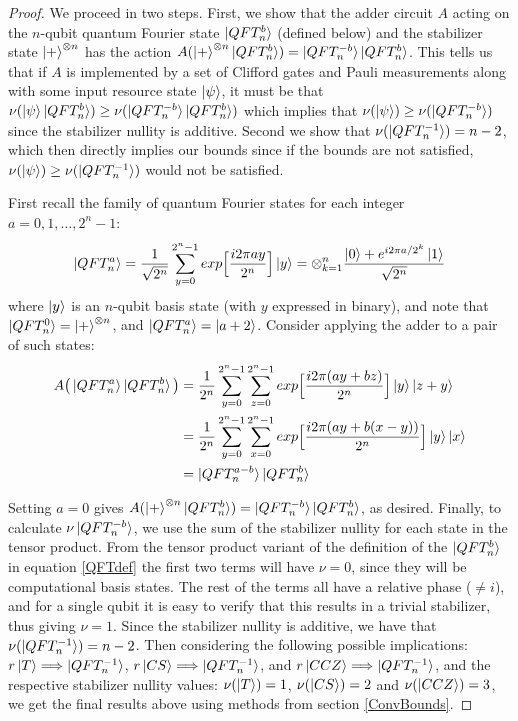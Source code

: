 \documentclass[12pt]{dalthesis}
\begin{document}
\begin{proof}
We proceed in two steps. First, we show that the adder circuit $A$ acting on the $n$-qubit quantum Fourier state $\ket{QFT_n^b}$ (defined below) and the stabilizer state $\ket{+}^{\otimes n}$ has the action $A(\ket{+}^{\otimes n} \ket{QFT_n^b}) = \ket{QFT_n^{-b}}\ket{QFT_n^b}$. This tells us that if $A$ is implemented by a set of Clifford gates and Pauli measurements along with some input resource state $\ket{\psi}$, it must be that $\nu (\ket{\psi} \ket{QFT_n^b}) \geq \nu(\ket{QFT_n^{-b}} \ket{QFT_n^b})$ which implies that $\nu (\ket{\psi}) \geq \nu(\ket{QFT_n^{-b}})$ since the stabilizer nullity is additive. Second we show that $\nu(\ket{QFT_n^{-1}}) = n-2$, which then directly implies our bounds since if the bounds are not satisfied, $\nu(\ket{\psi}) \geq \nu(\ket{QFT_n^{-1}})$ would not be satisfied.

First recall the family of quantum Fourier states for each integer $a = 0, 1, \dots, 2^n - 1$:
\begin{equation}
\label{QFTdef}
\ket{QFT_n^a} = \frac{1}{\sqrt{2^n}} \sum\limits_{y=0}^{2^n-1} exp \Big[ \frac{i2 \pi a y}{2^n} \Big] \ket{y} = \otimes_{k=1}^n \frac{\ket{0} + e^{i2\pi a/2^k} \ket{1}}{\sqrt{2^n}}
\end{equation}
where $\ket{y}$ is an $n$-qubit basis state (with $y$ expressed in binary), and note that $\ket{QFT_n^0} = \ket{+}^{\otimes n}$, and $\ket{QFT_n^a} = \ket{a + 2}$. Consider applying the adder to a pair of such states:
\begin{equation}
\begin{split}
A \big(\ket{QFT_n^a} \ket{QFT_n^b} \big) & = \frac{1}{2^n} \sum\limits_{y=0}^{2^n-1} \sum\limits_{z=0}^{2^n-1} exp \Big[ \frac{i2 \pi (ay + bz)}{2^n} \Big] \ket{y}\ket{z+y} \\
& = \frac{1}{2^n} \sum\limits_{y=0}^{2^n-1} \sum\limits_{x=0}^{2^n-1} exp \Big[ \frac{i2 \pi (ay + b(x-y))}{2^n} \Big] \ket{y}\ket{x} \\
& = \ket{QFT_n^{a-b}}\ket{QFT_n^b}
\end{split}
\end{equation}

Setting $a=0$ gives $A(\ket{+}^{\otimes n} \ket{QFT_n^b}) = \ket{QFT_n^{-b}}\ket{QFT_n^b}$, as desired. Finally, to calculate $\nu \ket{QFT_n^{-b}}$, we use the sum of the stabilizer nullity for each state in the tensor product. From the tensor product variant of the definition of the $\ket{QFT_n^b}$ in equation \ref{QFTdef} the first two terms will have $\nu = 0$, since they will be computational basis states. The rest of the terms all have a relative phase ($\neq i$), and for a single qubit it is easy to verify that this results in a trivial stabilizer, thus giving $\nu = 1$. Since the stabilizer nullity is additive, we have that $\nu(\ket{QFT_n^{-1}}) = n-2$. Then considering the following possible implications: $r\ket{T} \Longrightarrow \ket{QFT_n^{-1}}$, $r\ket{CS} \Longrightarrow \ket{QFT_n^{-1}}$, and $r\ket{CCZ} \Longrightarrow \ket{QFT_n^{-1}}$, and the respective stabilizer nullity values: $\nu (\ket{T}) = 1$, $\nu (\ket{CS}) = 2$ and $\nu (\ket{CCZ}) = 3$, we get the final results above using methods from section \ref{ConvBounds}.
\end{proof}
\end{document}
